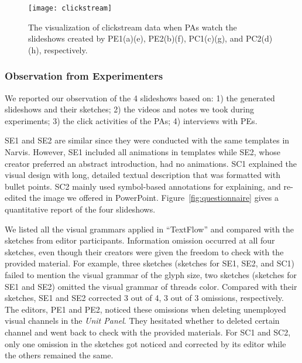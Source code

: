 \begin{figure}
 \centering %
 \texttt{[image: clickstream]}
 \caption{The visualization of clickstream data when PAs watch the slideshows created by PE1(a)(e), PE2(b)(f), PC1(c)(g), and PC2(d)(h), respectively. 
 }
 \label{fig:clickstream}
\end{figure}

\subsubsection{Observation from Experimenters}

We reported our observation of the 4 slideshows based on: 1) the generated slideshows and their sketches; 2) the videos and notes we took during experiments; 3) the click activities of the PAs; 4) interviews with PEs.

SE1 and SE2 are similar since they were conducted with the same templates in Narvis. However, SE1 included all animations in templates while SE2, whose creator preferred an abstract introduction, had no animations. 
SC1 explained the visual design with long, detailed textual description that was formatted with bullet points. SC2 mainly used symbol-based annotations for explaining, and re-edited the image we offered in PowerPoint. Figure~\ref{fig:questionnaire} gives a quantitative report of the four slideshows.

We listed all the visual grammars applied in ``TextFlow'' and compared with the sketches from editor participants. Information omission occurred at all four sketches, even though their creators were given the freedom to check with the provided material. For example, three sketches (sketches for SE1, SE2, and SC1) failed to mention the visual grammar of the glyph size, two sketches (sketches for SE1 and SE2) omitted the visual grammar of threads color. 
Compared with their sketches, SE1 and SE2 corrected 3 out of 4, 3 out of 3 omissions, respectively. The editors, PE1 and PE2, noticed these omissions when deleting unemployed visual channels in the \textit{Unit Panel}. They hesitated whether to deleted certain channel and went back to check with the provided materials.   
For SC1 and SC2, only one omission in the sketches got noticed and corrected by its editor while the others remained the same. 

